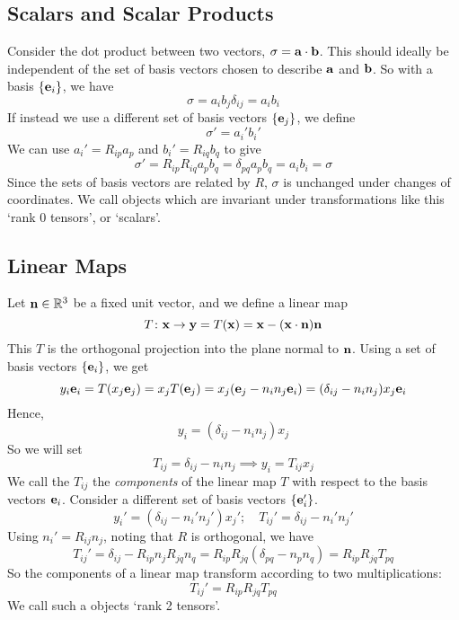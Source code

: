 \documentclass{article}
\begin{document}
\subsection{Scalars and Scalar Products}
Consider the dot product between two vectors, $\sigma = \vb a \cdot \vb b$. This should ideally be independent of the set of basis vectors chosen to describe $\vb a$ and $\vb b$. So with a basis $\{ \vb e_i \}$, we have
\[ \sigma = a_i b_j \delta_{ij} = a_i b_i \]
If instead we use a different set of basis vectors $\{ \vb e_j \}$, we define
\[ \sigma' = a_i' b_i' \]
We can use $a_i' = R_{ip} a_p$ and $b_i' = R_{iq} b_q$ to give
\[ \sigma' = R_{ip} R_{iq} a_p b_q = \delta_{pq} a_p b_q = a_i b_i = \sigma \]
Since the sets of basis vectors are related by $R$, $\sigma$ is unchanged under changes of coordinates. We call objects which are invariant under transformations like this `rank 0 tensors', or `scalars'.

\subsection{Linear Maps}
Let $\vb n \in \mathbb R^3$ be a fixed unit vector, and we define a linear map
\[ T \colon \vb x \to \vb y = T(\vb x) = \vb x - (\vb x \cdot \vb n) \vb n \]
This $T$ is the orthogonal projection into the plane normal to $\vb n$. Using a set of basis vectors $\{ \vb e_i \}$, we get
\[ y_i \vb e_i = T(x_j \vb e_j) = x_j T(\vb e_j) = x_j (\vb e_j - n_i n_j \vb e_i) = (\delta_{ij} - n_i n_j) x_j \vb e_i \]
Hence,
\[ y_i = (\delta_{ij} - n_i n_j) x_j \]
So we will set
\[ T_{ij} = \delta_{ij} - n_i n_j \implies y_i = T_{ij} x_j \]
We call the $T_{ij}$ the \textit{components} of the linear map $T$ with respect to the basis vectors $\vb e_i$. Consider a different set of basis vectors $\{ \vb e_i' \}$.
\[ y_i' = (\delta_{ij} - n_i' n_j') x_j';\quad T_{ij}' = \delta_{ij} - n_i' n_j' \]
Using $n_i' = R_{ij} n_j$, noting that $R$ is orthogonal, we have
\[ T_{ij}' = \delta_{ij} - R_{ip} n_j R_{jq} n_q = R_{ip} R_{jq} (\delta_{pq} - n_p n_q) = R_{ip} R_{jq} T_{pq} \]
So the components of a linear map transform according to two multiplications:
\[ T_{ij}' = R_{ip} R_{jq} T_{pq} \]
We call such a objects `rank 2 tensors'.
\end{document}
